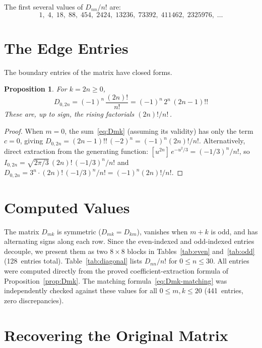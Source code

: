 \documentclass[11pt,a4paper]{article}
\theoremstyle{definition}
\theoremstyle{plain}
\newtheorem{proposition}[definition]{Proposition}
\begin{document}
The first several values of $D_{nn}/n!$ are:
\[
  1,\; 4,\; 18,\; 88,\; 454,\; 2424,\; 13236,\; 73392,\;
  411462,\; 2325976,\; \ldots
\]

\section{The Edge Entries}

The boundary entries of the matrix have closed forms.

\begin{proposition}\label{prop:edges}
For $k = 2n \ge 0$,
\[
  D_{0,2n} = (-1)^n\, \frac{(2n)!}{n!} = (-1)^n\, 2^n\, (2n-1)!!
\]
These are, up to sign, the \emph{rising factorials} $(2n)!/n!$\,.
\end{proposition}

\begin{proof}
When $m = 0$, the sum~\eqref{eq:Dmk} (assuming its validity) has only
the term $c = 0$, giving $D_{0,2n} = (2n-1)!!\,(-2)^n =
(-1)^n(2n)!/n!$. Alternatively, direct extraction from the generating
function: $[u^{2n}]\, e^{-u^2/3} = (-1/3)^n/n!$, so
$I_{0,2n} = \sqrt{2\pi/3}\,(2n)!\,(-1/3)^n/n!$ and
$D_{0,2n} = 3^n \cdot (2n)!\,(-1/3)^n/n! = (-1)^n(2n)!/n!$.
\end{proof}

\section{Computed Values}

The matrix $D_{mk}$ is symmetric ($D_{mk} = D_{km}$), vanishes when
$m + k$ is odd, and has alternating signs along each row. Since the
even-indexed and odd-indexed entries decouple, we present them as two
$8 \times 8$ blocks in Tables~\ref{tab:even} and~\ref{tab:odd}
(128~entries total). Table~\ref{tab:diagonal} lists $D_{nn}/n!$ for
$0 \le n \le 30$. All entries were computed directly from the proved
coefficient-extraction formula of Proposition~\ref{prop:Dmk}. The
matching formula~\eqref{eq:Dmk-matching} was independently checked
against these values for all $0 \le m, k \le 20$ (441~entries, zero
discrepancies).

\section{Recovering the Original Matrix}
\end{document}
